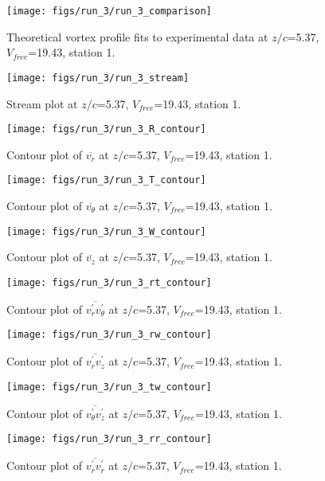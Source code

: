 \begin{figure}[H]
\centering
\texttt{[image: figs/run\_3/run\_3\_comparison]}
\caption{Theoretical vortex profile fits to experimental data at $z/c$=5.37, $V_{free}$=19.43, station 1.}
\end{figure}


\begin{figure}[H]
\centering
\texttt{[image: figs/run\_3/run\_3\_stream]}
\caption{Stream plot at $z/c$=5.37, $V_{free}$=19.43, station 1.}
\end{figure}


\begin{figure}[H]
\centering
\texttt{[image: figs/run\_3/run\_3\_R\_contour]}
\caption{Contour plot of $\overline{v_{r}}$ at $z/c$=5.37, $V_{free}$=19.43, station 1.}
\end{figure}


\begin{figure}[H]
\centering
\texttt{[image: figs/run\_3/run\_3\_T\_contour]}
\caption{Contour plot of $\overline{v_{\theta}}$ at $z/c$=5.37, $V_{free}$=19.43, station 1.}
\end{figure}


\begin{figure}[H]
\centering
\texttt{[image: figs/run\_3/run\_3\_W\_contour]}
\caption{Contour plot of $\overline{v_{z}}$ at $z/c$=5.37, $V_{free}$=19.43, station 1.}
\end{figure}


\begin{figure}[H]
\centering
\texttt{[image: figs/run\_3/run\_3\_rt\_contour]}
\caption{Contour plot of $\overline{v_{r}^{\prime} v_{\theta}^{\prime}}$ at $z/c$=5.37, $V_{free}$=19.43, station 1.}
\end{figure}


\begin{figure}[H]
\centering
\texttt{[image: figs/run\_3/run\_3\_rw\_contour]}
\caption{Contour plot of $\overline{v_{r}^{\prime} v_{z}^{\prime}}$ at $z/c$=5.37, $V_{free}$=19.43, station 1.}
\end{figure}


\begin{figure}[H]
\centering
\texttt{[image: figs/run\_3/run\_3\_tw\_contour]}
\caption{Contour plot of $\overline{v_{\theta}^{\prime} v_{z}^{\prime}}$ at $z/c$=5.37, $V_{free}$=19.43, station 1.}
\end{figure}


\begin{figure}[H]
\centering
\texttt{[image: figs/run\_3/run\_3\_rr\_contour]}
\caption{Contour plot of $\overline{v_{r}^{\prime} v_{r}^{\prime}}$ at $z/c$=5.37, $V_{free}$=19.43, station 1.}
\end{figure}


